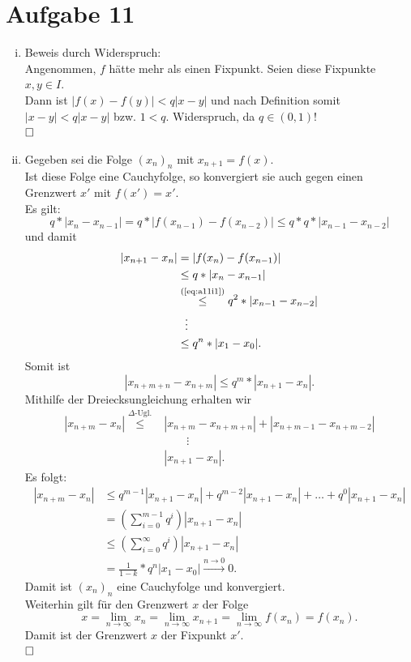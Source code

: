 \documentclass[12pt,a4paper]{article}
\newcommand{\qed}{\null\nobreak\hfill\square}
\begin{document}
\section*{Aufgabe 11}

\begin{enumerate}[(i)]
    \item Beweis durch Widerspruch:\\
    Angenommen, $f$ hätte mehr als einen Fixpunkt.
    Seien diese Fixpunkte $x,y \in I$.\\
    Dann ist
    $|f(x) - f(y)| < q|x - y|$ und nach Definition somit\\
    $|x - y| < q|x - y|$ bzw. $1 < q$.
    Widerspruch, da $q \in (0, 1)$!\\
    $\qed$

    \item Gegeben sei die Folge $(x_n)_n$ mit $x_{n+1} = f(x)$.\\
    Ist diese Folge eine Cauchyfolge, so konvergiert sie auch gegen einen Grenzwert $x'$ mit $f(x') = x'$.\\
    Es gilt:
    \begin{equation}
        \label{eq:a11i1}
        q * |x_n - x_{n-1}| = q * |f(x_{n-1}) - f(x_{n-2})| \leq q * q * |x_{n-1} - x_{n-2}|
    \end{equation}
    und damit
    \begin{align*}
        |x_{n+1} - x_n| &= |f(x_n) - f(x_{n-1})|\\
        &\leq q * |x_n - x_{n-1}|\\
        &\overset{\text{(\ref{eq:a11i1})}}{\leq} q^2 * |x_{n-1} - x_{n-2}|\\
        &\ \ \vdots\\
        &\leq q^n * |x_1 - x_0|.
    \end{align*}
    Somit ist
    $$|x_{n+m+n} - x_{n+m}| \leq q^m * |x_{n+1} - x_n|.$$
    Mithilfe der Dreiecksungleichung erhalten wir
    \begin{align*}
        |x_{n+m} - x_n| \overset{\Delta\text{-Ugl.}}{\leq} &|x_{n+m} - x_{n+m+n}| + |x_{n+m-1} - x_{n+m-2}|\\
        &\qquad\vdots\\
        &|x_{n+1} - x_n|.
    \end{align*}
    Es folgt:
    \begin{align*}
        |x_{n+m} - x_n| &\leq q^{m-1}|x_{n+1}-x_n|+q^{m-2}|x_{n+1}-x_n|+\dots+q^0|x_{n+1}-x_n|\\
        &= \left(\sum\limits_{i=0}^{m-1}q^i\right)|x_{n+1}-x_n|\\
        &\leq \left(\sum\limits_{i=0}^{\infty}q^i\right)|x_{n+1}-x_n|\\
        &= \frac{1}{1-k}*q^n|x_1-x_0| \overset{n \to 0}{\longrightarrow} 0.
    \end{align*}
    Damit ist $(x_n)_n$ eine Cauchyfolge und konvergiert.\\
    Weiterhin gilt für den Grenzwert $x$ der Folge
    $$x = \lim\limits_{n \to \infty}x_n = \lim\limits_{n \to \infty}x_{n+1} = \lim\limits_{n \to \infty}f(x_n) = f(x_n).$$
    Damit ist der Grenzwert $x$ der Fixpunkt $x'$.\\
    $\qed$


\end{enumerate}
\end{document}
